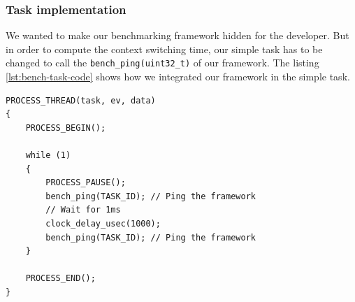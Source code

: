\subsubsection{Task implementation}

We wanted to make our benchmarking framework hidden for the developer.
But in order to compute the context switching time, our simple task has to be changed to call the \texttt{bench\_ping(uint32\_t)} of our framework.
The listing \ref{lst:bench-task-code} shows how we integrated our framework in the simple task.

\begin{lstlisting}[float, style=CStyle, label={lst:bench-task-code}, caption={Source code of the task with benchmarking framework calls}]
PROCESS_THREAD(task, ev, data)
{
    PROCESS_BEGIN();

    while (1)
    {
        PROCESS_PAUSE();
        bench_ping(TASK_ID); // Ping the framework
        // Wait for 1ms
        clock_delay_usec(1000);
        bench_ping(TASK_ID); // Ping the framework
    }

    PROCESS_END();
}
\end{lstlisting}